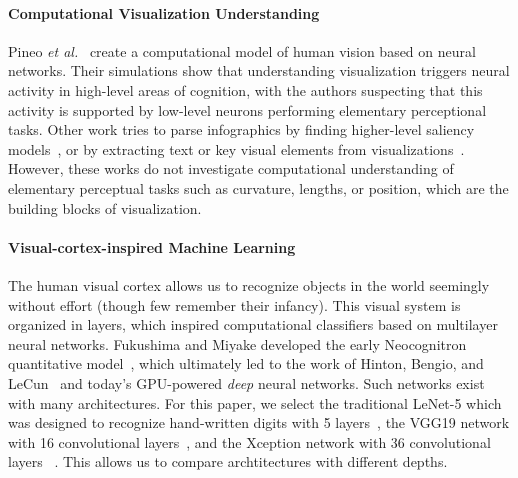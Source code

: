 \paragraph{Computational Visualization Understanding} Pineo \textit{et al.}~\cite{Pineo2012_computational_perception} create a computational model of human vision based on neural networks. Their simulations show that understanding visualization triggers neural activity in high-level areas of cognition, with the authors suspecting that this activity is supported by low-level neurons performing elementary perceptional tasks. Other work tries to parse infographics by finding higher-level saliency models~\cite{bylinskii2016should}, or by extracting text or key visual elements from visualizations~\cite{diagram_understanding,kembhavi2016diagram,zoya_text_visual_tags}. However, these works do not investigate computational understanding of elementary perceptual tasks such as curvature, lengths, or position, which are the building blocks of visualization.


\paragraph{Visual-cortex-inspired Machine Learning} The human visual cortex allows us to recognize objects in the world seemingly without effort (though few remember their infancy). This visual system is organized in layers, which inspired computational classifiers based on multilayer neural networks. Fukushima and Miyake developed the early Neocognitron quantitative model~\cite{fukushima1982neocognitron}, which ultimately led to the work of Hinton, Bengio, and LeCun~\cite{lecun2015deep} and today's GPU-powered \emph{deep} neural networks. Such networks exist with many architectures. For this paper, we select the traditional LeNet-5 which was designed to recognize hand-written digits with 5 layers~\cite{lenet}, the VGG19 network with 16 convolutional layers~\cite{simonyan_very_deep2014}, and the Xception network with 36 convolutional layers ~\cite{xception}. This allows us to compare archtitectures with different depths.

